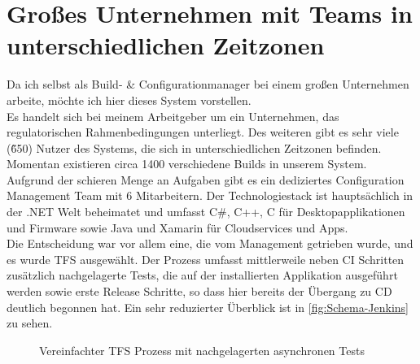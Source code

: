 \section{Großes Unternehmen mit Teams in unterschiedlichen Zeitzonen}
Da ich selbst als Build- \& Configurationmanager bei einem großen Unternehmen arbeite, möchte ich hier dieses System vorstellen.\\
Es handelt sich bei meinem Arbeitgeber um ein Unternehmen, das regulatorischen Rahmenbedingungen unterliegt. Des weiteren gibt es sehr viele (\~ 650) Nutzer des Systems, die sich in unterschiedlichen Zeitzonen befinden. Momentan existieren circa 1400 verschiedene Builds in unserem System. Aufgrund der schieren Menge an Aufgaben gibt es ein dediziertes Configuration Management Team mit 6 Mitarbeitern. Der Technologiestack ist hauptsächlich in der .NET Welt beheimatet und umfasst C\#, C++, C für Desktopapplikationen und Firmware sowie Java und Xamarin für Cloudservices und Apps.\\
Die Entscheidung war vor allem eine, die vom Management getrieben wurde, und es wurde TFS ausgewählt. Der Prozess umfasst mittlerweile neben CI Schritten zusätzlich nachgelagerte Tests, die auf der installierten Applikation ausgeführt werden sowie erste Release Schritte, so dass hier bereits der Übergang zu CD deutlich begonnen hat. Ein sehr reduzierter Überblick ist in \autoref{fig:Schema-Jenkins} zu sehen.
\begin{figure}[H]
  \centering
  \caption{Vereinfachter TFS Prozess mit nachgelagerten asynchronen Tests}\label{fig:Schema-TFS}
\end{figure}